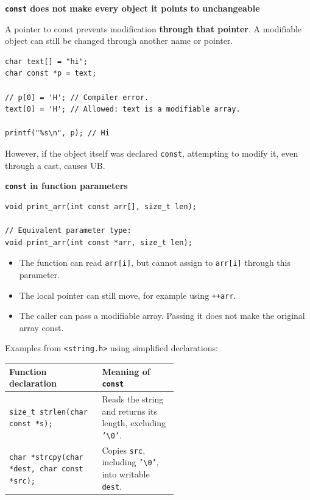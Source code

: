\documentclass[11pt,a4paper]{article}
\begin{document}
\textbf{\texttt{const} does not make every object it points to
unchangeable}

A pointer to const prevents modification
\textbf{through that pointer}. A modifiable object can still be
changed through another name or pointer.

\begin{lstlisting}[style=cscode]
char text[] = "hi";
char const *p = text;

// p[0] = 'H'; // Compiler error.
text[0] = 'H'; // Allowed: text is a modifiable array.

printf("%s\n", p); // Hi
\end{lstlisting}

However, if the object itself was declared \texttt{const},
attempting to modify it, even through a cast, causes UB.

\textbf{\texttt{const} in function parameters}

\begin{lstlisting}[style=cscode]
void print_arr(int const arr[], size_t len);

// Equivalent parameter type:
void print_arr(int const *arr, size_t len);
\end{lstlisting}

\begin{itemize}
    \item The function can read \texttt{arr[i]}, but cannot assign
          to \texttt{arr[i]} through this parameter.
    \item The local pointer can still move, for example using
          \texttt{++arr}.
    \item The caller can pass a modifiable array. Passing it does
          not make the original array const.
\end{itemize}

Examples from \texttt{<string.h>} using simplified declarations:

\begin{longtable}{@{}
    >{\raggedright\arraybackslash}p{0.55\linewidth}
    >{\raggedright\arraybackslash}p{}@{}}
\toprule
\textbf{Function declaration} &
\textbf{Meaning of \texttt{const}} \\
\midrule
\endhead
\bottomrule
\endlastfoot
\texttt{size\_t strlen(char const *s);}
    & Reads the string and returns its length, excluding
      \texttt{'\textbackslash0'}. \\
\texttt{char *strcpy(char *dest, char const *src);}
    & Copies \texttt{src}, including
      \texttt{'\textbackslash0'}, into writable \texttt{dest}. \\
\end{longtable}
\end{document}

